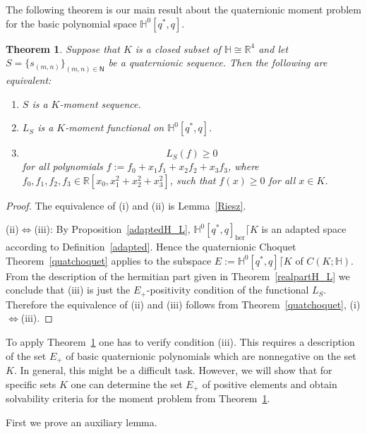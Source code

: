 \documentclass[11pt,a4paper]{amsart}
\newtheorem{theorem}{Theorem}[section]
\theoremstyle{definition}
\begin{document}
The following theorem is our main result about the quaternionic moment
problem for the basic polynomial space $\mathbb{H}^{0}[q^{*}, q]$.
%
\begin{theorem}%
\label{qmp1}
  Suppose that $K$ is a closed subset of
$\mathbb{H}\cong \mathbb{R}^{4}$ and let
$S=\{s_{(m,n)}\}_{(m,n) \in \mathsf{{N}}}$ be a quaternionic sequence. Then the
following are equivalent:%
%
\begin{enumerate}
%
\item[\emph{(i)}] $S$ is a $K$-moment sequence.
%
\item[\emph{(ii)}] $L_{S}$ is a $K$-moment functional on
$ \mathbb{H}^{0}[q^{*}, q]$.
%
\item[\emph{(iii)}]
%
\begin{equation}
L_{S}(f)\geq 0
\label{eq55}
\end{equation}
%
for all polynomials $f:=f_{0} +x_{1}f_{1}+x_{2}f_{2} +x_{3} f_{3}$, where
$f_{0}, f_{1},f_{2},f_{3}\in \mathbb{R}[x_{0}, x_{1}^{2}+x_{2}^{2}+x_{3}^{2}]$,
such that $f(x)\geq 0$ for all $x\in K$.
%
\end{enumerate}
%
\end{theorem}
%
\begin{proof}
The equivalence of (i) and (ii) is Lemma~\ref{Riesz}.

(ii)$\Leftrightarrow $(iii): By Proposition~\ref{adaptedH_L},
$ \mathbb{H}^{0}[q^{*}, q]_{\mathrm{her}}\lceil K$ is an adapted space
according to Definition~\ref{adapted}. Hence the quaternionic Choquet Theorem~\ref{quatchoquet} applies to the subspace
$E:= \mathbb{H}^{0}[q^{*}, q]\lceil K$ of $C(K;\mathbb{H})$. From the description
of the hermitian part given in Theorem~\ref{realpartH_L} we conclude that
(iii) is just the $E_{+}$-positivity condition of the functional
$L_{S}$. Therefore the equivalence of (ii) and (iii) follows from Theorem~\ref{quatchoquet}, (i)$\Leftrightarrow $(iii).
\end{proof}

To apply Theorem~\ref{qmp1} one has to verify condition (iii). This requires
a description of the set $E_{+}$ of basic quaternionic polynomials which
are nonnegative on the set $K$. In general, this might be a difficult task.
However, we will show that for specific sets $K$ one can determine the
set $E_{+}$ of positive elements and obtain solvability criteria for the
moment problem from Theorem~\ref{qmp1}.

First we prove an auxiliary lemma.
\end{document}
